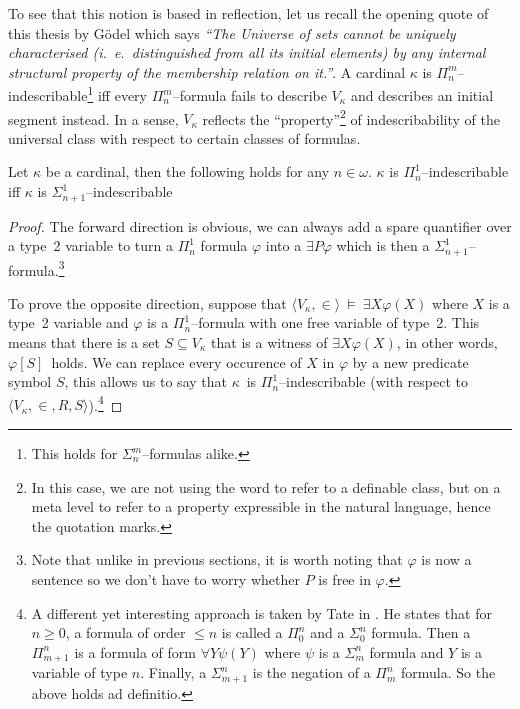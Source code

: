 To see that this notion is based in reflection, let us recall the opening quote of this thesis by Gödel which says \emph{``The Universe of sets cannot be uniquely characterised (i.~e.~distinguished from all its initial elements) by any internal structural property of the membership relation on it.''}. A cardinal $\kappa$ is $\Pi^m_n$–indescribable\footnote{This holds for $\Sigma^m_n$–formulas alike.} iff every $\Pi^m_n$–formula fails to describe $V_\kappa$ and describes an initial segment instead.
In a sense, $V_\kappa$ reflects the ``property''\footnote{In this case, we are not using the word to refer to a definable class, but on a meta level to refer to a property expressible in the natural language, hence the quotation marks.} of indescribability of the universal class with respect to certain classes of formulas.


\begin{lemma}
Let $\kappa$ be a cardinal, then the following holds for any $n \in \omega$. $\kappa$ is $\Pi^1_n$–indescribable iff $\kappa$ is $\Sigma^1_{n+1}$–indescribable
\end{lemma}

\begin{proof}
The forward direction is obvious, we can always add a spare quantifier over a type~2 variable to turn a $\Pi^1_n$ formula $\varphi$ into a $\exists P \varphi$ which is then a $\Sigma^1_{n+1}$–formula.\footnote{Note that unlike in previous sections, it is worth noting that $\varphi$ is now a sentence so we don't have to worry whether $P$ is free in $\varphi$.}

To prove the opposite direction, suppose that $\langle V_\kappa, \in \rangle~\models~\exists X \varphi(X)$ where $X$ is a type~2 variable and $\varphi$ is a $\Pi^1_n$–formula with one free variable of type~2. 
This means that there is a set $S \subseteq V_\kappa$ that is a witness of $\exists X \varphi(X)$, in other words, $\varphi[S]$ holds. 
We can replace every occurence of $X$ in $\varphi$ by a new predicate symbol $S$, this allows us to say that $\kappa$ is $\Pi^1_n$–indescribable (with respect to $\langle V_\kappa, \in, R, S \rangle$).\footnote{A different yet interesting approach is taken by Tate in \cite{Tait_constructingcardinals}. He states that for $n\geq 0$, a formula of order $\leq n$ is called a $\Pi^n_0$ and a $\Sigma^n_0$ formula. Then a $\Pi^n_{m+1}$ is a formula of form $\forall Y \psi(Y)$ where $\psi$ is a $\Sigma^n_m$ formula and $Y$ is a variable of type $n$. Finally, a $\Sigma^n_{m+1}$ is the negation of a $\Pi^n_m$ formula. So the above holds ad definitio.}
\end{proof}


